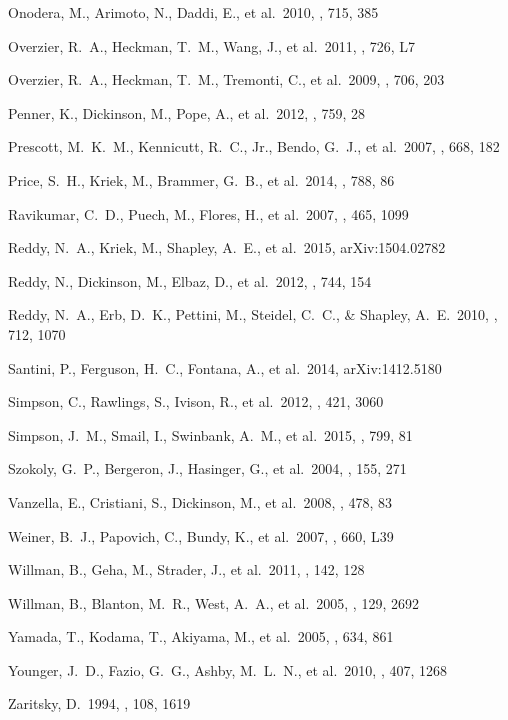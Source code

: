 \documentclass[preprint]{aastex}
\begin{document}
\begin{thebibliography}
 Onodera, M., Arimoto, 
N., Daddi, E., et al.\ 2010, \apj, 715, 385

 Overzier, R.~A., 
Heckman, T.~M., Wang, J., et al.\ 2011, \apjl, 726, L7 

 Overzier, R.~A., 
Heckman, T.~M., Tremonti, C., et al.\ 2009, \apj, 706, 203

 Penner, K., Dickinson, 
M., Pope, A., et al.\ 2012, \apj, 759, 28 

 Prescott, M.~K.~M., 
Kennicutt, R.~C., Jr., Bendo, G.~J., et al.\ 2007, \apj, 668, 182

 Price, S.~H., Kriek, M., 
Brammer, G.~B., et al.\ 2014, \apj, 788, 86

 Ravikumar, C.~D., Puech, M.,
Flores, H., et al.\ 2007, \aap, 465, 1099

 Reddy, N.~A., Kriek, M., 
Shapley, A.~E., et al.\ 2015, arXiv:1504.02782

 Reddy, N., Dickinson, M.,
Elbaz, D., et al.\ 2012, \apj, 744, 154 

 Reddy, N.~A., Erb, D.~K.,
Pettini, M., Steidel, C.~C., \& Shapley, A.~E.\ 2010, \apj, 712, 1070

 Santini, P., Ferguson, 
H.~C., Fontana, A., et al.\ 2014, arXiv:1412.5180

 Simpson, C., Rawlings, 
S., Ivison, R., et al.\ 2012, \mnras, 421, 3060

 Simpson, J.~M., Smail, 
I., Swinbank, A.~M., et al.\ 2015, \apj, 799, 81

 Szokoly, G.~P., 
Bergeron, J., Hasinger, G., et al.\ 2004, \apjs, 155, 271

 Vanzella, E., Cristiani, S.,
Dickinson, M., et al.\ 2008, \aap, 478, 83

 Weiner, B.~J., Papovich, 
C., Bundy, K., et al.\ 2007, \apjl, 660, L39

 Willman, B., Geha, M., 
Strader, J., et al.\ 2011, \aj, 142, 128 

 Willman, B., Blanton, 
M.~R., West, A.~A., et al.\ 2005, \aj, 129, 2692

 Yamada, T., Kodama, T., 
Akiyama, M., et al.\ 2005, \apj, 634, 861

 Younger, J.~D., Fazio, 
G.~G., Ashby, M.~L.~N., et al.\ 2010, \mnras, 407, 1268

 Zaritsky, D.\ 1994, \aj, 108, 
1619

\end{thebibliography}
\end{document}
